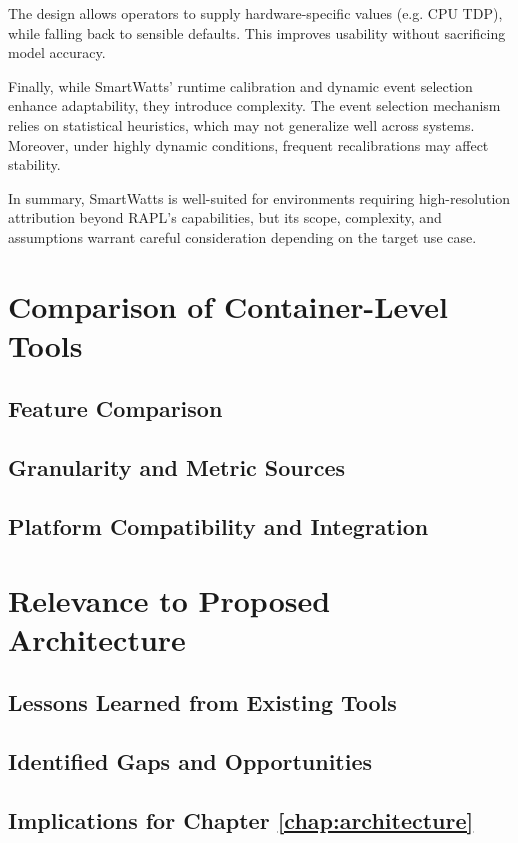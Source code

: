 The design allows operators to supply hardware-specific values (e.g. CPU TDP), while falling back to sensible defaults. This improves usability without sacrificing model accuracy.

Finally, while SmartWatts' runtime calibration and dynamic event selection enhance adaptability, they introduce complexity. The event selection mechanism relies on statistical heuristics, which may not generalize well across systems. Moreover, under highly dynamic conditions, frequent recalibrations may affect stability.

In summary, SmartWatts is well-suited for environments requiring high-resolution attribution beyond RAPL's capabilities, but its scope, complexity, and assumptions warrant careful consideration depending on the target use case.


\section{Comparison of Container-Level Tools}
\label{sec:tool-comparison}
\subsection{Feature Comparison}
\label{sec:feature-comparison}
\subsection{Granularity and Metric Sources}
\label{sec:granularity-comparison}
\subsection{Platform Compatibility and Integration}
\label{sec:integration-comparison}

\section{Relevance to Proposed Architecture}
\label{sec:relevance-to-architecture}
\subsection{Lessons Learned from Existing Tools}
\label{sec:lessons-learned}
\subsection{Identified Gaps and Opportunities}
\label{sec:tool-gaps}
\subsection{Implications for Chapter \ref{chap:architecture}}
\label{sec:implications-architecture}

